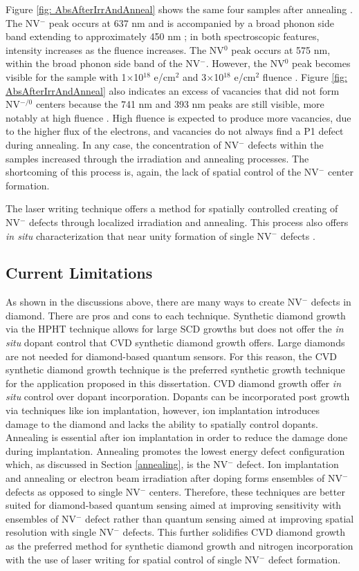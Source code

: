 	Figure \ref{fig: AbsAfterIrrAndAnneal} shows the same four samples after annealing \cite{Luo2021}. The NV$^-$ peak occurs at 637 nm and is accompanied by a broad phonon side band extending to approximately 450 nm \cite{Luo2021}; in both spectroscopic features, intensity increases as the fluence increases. The NV$^0$ peak occurs at 575 nm, within the broad phonon side band of the NV$^-$. However, the NV$^0$ peak becomes visible for the sample with 1$\times$10$^{18}$ e/cm$^2$ and 3$\times$10$^{18}$ e/cm$^2$ fluence \cite{Luo2021}. Figure \ref{fig: AbsAfterIrrAndAnneal} also indicates an excess of vacancies that did not form NV$^{-/0}$ centers because the 741 nm and 393 nm peaks are still visible, more notably at high fluence \cite{Luo2021}. High fluence is expected to produce more vacancies, due to the higher flux of the electrons, and vacancies do not always find a P1 defect during annealing. In any case, the concentration of NV$^-$ defects within the samples increased through the irradiation and annealing processes. The shortcoming of this process is, again, the lack of spatial control of the NV$^-$ center formation. 

    The laser writing technique offers a method for spatially controlled creating of NV$^-$ defects through localized irradiation and annealing. This process also offers \textit{in situ} characterization that near unity formation of single NV$^-$ defects \cite{Chen2019}.
	

\subsection{Current Limitations}
\indent

As shown in the discussions above, there are many ways to create NV$^-$ defects in diamond. There are pros and cons to each technique. Synthetic diamond growth via the HPHT technique allows for large SCD growths but does not offer the \textit{in situ} dopant control that CVD synthetic diamond growth offers. Large diamonds are not needed for diamond-based quantum sensors. For this reason, the CVD synthetic diamond growth technique is the preferred synthetic growth technique for the application proposed in this dissertation. CVD diamond growth offer \textit{in situ} control over dopant incorporation. Dopants can be incorporated post growth via techniques like ion implantation, however, ion implantation introduces damage to the diamond and lacks the ability to spatially control dopants. Annealing is essential after ion implantation in order to reduce the damage done during implantation. Annealing promotes the lowest energy defect configuration which, as discussed in Section \ref{annealing}, is the NV$^-$ defect. Ion implantation and annealing or electron beam irradiation after doping forms ensembles of NV$^-$ defects as opposed to single NV$^-$ centers. Therefore, these techniques are better suited for diamond-based quantum sensing aimed at improving sensitivity with ensembles of NV$^-$ defect rather than quantum sensing aimed at improving spatial resolution with single NV$^-$ defects. This further solidifies CVD diamond growth as the preferred method for synthetic diamond growth and nitrogen incorporation with the use of laser writing for spatial control of single NV$^-$ defect formation.  
       

